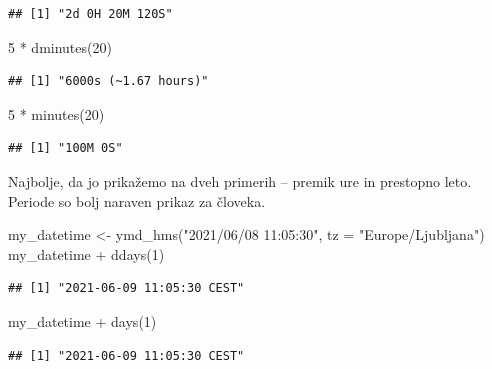 \documentclass[
]{book}
\newenvironment{Shaded}{\begin{snugshade}}{\end{snugshade}}
\newcommand{\AttributeTok}[1]{\textcolor[rgb]{0.77,0.63,0.00}{#1}}
\newcommand{\DecValTok}[1]{\textcolor[rgb]{0.00,0.00,0.81}{#1}}
\newcommand{\FunctionTok}[1]{\textcolor[rgb]{0.00,0.00,0.00}{#1}}
\newcommand{\NormalTok}[1]{#1}
\newcommand{\OtherTok}[1]{\textcolor[rgb]{0.56,0.35,0.01}{#1}}
\newcommand{\SpecialCharTok}[1]{\textcolor[rgb]{0.00,0.00,0.00}{#1}}
\newcommand{\StringTok}[1]{\textcolor[rgb]{0.31,0.60,0.02}{#1}}
\begin{document}
\begin{verbatim}
## [1] "2d 0H 20M 120S"
\end{verbatim}

\begin{Shaded}
\begin{Highlighting}[]
\DecValTok{5} \SpecialCharTok{*} \FunctionTok{dminutes}\NormalTok{(}\DecValTok{20}\NormalTok{)}
\end{Highlighting}
\end{Shaded}

\begin{verbatim}
## [1] "6000s (~1.67 hours)"
\end{verbatim}

\begin{Shaded}
\begin{Highlighting}[]
\DecValTok{5} \SpecialCharTok{*} \FunctionTok{minutes}\NormalTok{(}\DecValTok{20}\NormalTok{)}
\end{Highlighting}
\end{Shaded}

\begin{verbatim}
## [1] "100M 0S"
\end{verbatim}

Najbolje, da jo prikažemo na dveh primerih -- premik ure in prestopno leto. Periode so bolj naraven prikaz za človeka.

\begin{Shaded}
\begin{Highlighting}[]
\NormalTok{my\_datetime }\OtherTok{\textless{}{-}} \FunctionTok{ymd\_hms}\NormalTok{(}\StringTok{"2021/06/08 11:05:30"}\NormalTok{, }\AttributeTok{tz =} \StringTok{"Europe/Ljubljana"}\NormalTok{)}
\NormalTok{my\_datetime }\SpecialCharTok{+} \FunctionTok{ddays}\NormalTok{(}\DecValTok{1}\NormalTok{)}
\end{Highlighting}
\end{Shaded}

\begin{verbatim}
## [1] "2021-06-09 11:05:30 CEST"
\end{verbatim}

\begin{Shaded}
\begin{Highlighting}[]
\NormalTok{my\_datetime }\SpecialCharTok{+} \FunctionTok{days}\NormalTok{(}\DecValTok{1}\NormalTok{)}
\end{Highlighting}
\end{Shaded}

\begin{verbatim}
## [1] "2021-06-09 11:05:30 CEST"
\end{verbatim}
\end{document}
